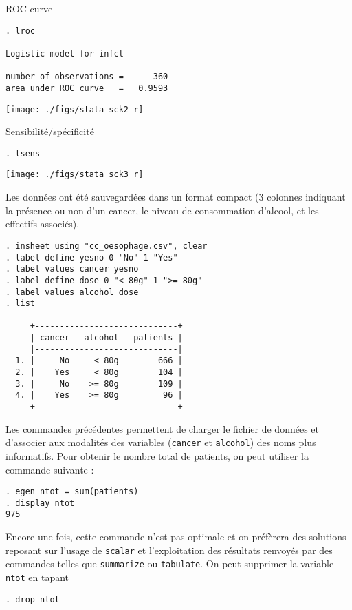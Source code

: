 
ROC curve
\begin{verbatim}
. lroc

Logistic model for infct

number of observations =      360
area under ROC curve   =   0.9593
\end{verbatim}

\texttt{[image: ./figs/stata\_sck2\_r]}

Sensibilité/spécificité
\begin{verbatim}
. lsens
\end{verbatim}

\texttt{[image: ./figs/stata\_sck3\_r]}

% 
%
%
\soln{\ref{exo:10.6}}
Les données ont été sauvegardées dans un format compact (3 colonnes
indiquant la présence ou non d'un cancer, le niveau de consommation
d'alcool, et les effectifs associés).
\begin{verbatim}
. insheet using "cc_oesophage.csv", clear
. label define yesno 0 "No" 1 "Yes" 
. label values cancer yesno 
. label define dose 0 "< 80g" 1 ">= 80g"
. label values alcohol dose
. list

     +-----------------------------+
     | cancer   alcohol   patients |
     |-----------------------------|
  1. |     No     < 80g        666 |
  2. |    Yes     < 80g        104 |
  3. |     No    >= 80g        109 |
  4. |    Yes    >= 80g         96 |
     +-----------------------------+
\end{verbatim}
Les commandes précédentes permettent de charger le fichier de données et
d'associer aux modalités des variables (\texttt{cancer} et \texttt{alcohol})
des noms plus informatifs. Pour obtenir le nombre total de patients, on peut
utiliser la commande suivante :
\begin{verbatim}
. egen ntot = sum(patients)
. display ntot
975
\end{verbatim}
Encore une fois, cette commande n'est pas optimale et on préfèrera des
solutions reposant sur l'usage de \verb|scalar| et l'exploitation des
résultats renvoyés par des commandes telles que \verb|summarize| ou
\verb|tabulate|. On peut supprimer la variable \texttt{ntot} en tapant 
\begin{verbatim}
. drop ntot
\end{verbatim}

